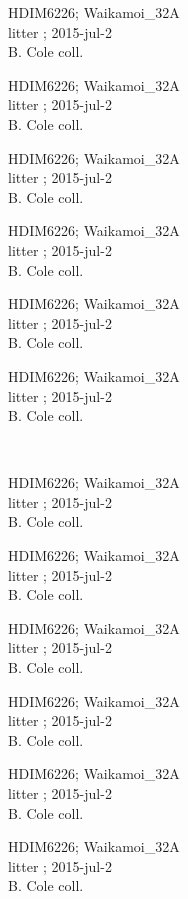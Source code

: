 \documentclass[2pt]{extarticle}
\begin{document}
\noindent
\parbox{0.16\textwidth}{\tiny \raggedright \rule[-0.3\baselineskip]{0pt}{10pt}HDIM6226; Waikamoi\_32A\\ litter  ; 2015-jul-2\\ B. Cole coll.}
\parbox{0.16\textwidth}{\tiny \raggedright \rule[-0.3\baselineskip]{0pt}{10pt}HDIM6226; Waikamoi\_32A\\ litter  ; 2015-jul-2\\ B. Cole coll.}
\parbox{0.16\textwidth}{\tiny \raggedright \rule[-0.3\baselineskip]{0pt}{10pt}HDIM6226; Waikamoi\_32A\\ litter  ; 2015-jul-2\\ B. Cole coll.}
\parbox{0.16\textwidth}{\tiny \raggedright \rule[-0.3\baselineskip]{0pt}{10pt}HDIM6226; Waikamoi\_32A\\ litter  ; 2015-jul-2\\ B. Cole coll.}
\parbox{0.16\textwidth}{\tiny \raggedright \rule[-0.3\baselineskip]{0pt}{10pt}HDIM6226; Waikamoi\_32A\\ litter  ; 2015-jul-2\\ B. Cole coll.}
\parbox{0.16\textwidth}{\tiny \raggedright \rule[-0.3\baselineskip]{0pt}{10pt}HDIM6226; Waikamoi\_32A\\ litter  ; 2015-jul-2\\ B. Cole coll.} \\ 
\vspace{0.001in} 

\noindent
\parbox{0.16\textwidth}{\tiny \raggedright \rule[-0.3\baselineskip]{0pt}{10pt}HDIM6226; Waikamoi\_32A\\ litter  ; 2015-jul-2\\ B. Cole coll.}
\parbox{0.16\textwidth}{\tiny \raggedright \rule[-0.3\baselineskip]{0pt}{10pt}HDIM6226; Waikamoi\_32A\\ litter  ; 2015-jul-2\\ B. Cole coll.}
\parbox{0.16\textwidth}{\tiny \raggedright \rule[-0.3\baselineskip]{0pt}{10pt}HDIM6226; Waikamoi\_32A\\ litter  ; 2015-jul-2\\ B. Cole coll.}
\parbox{0.16\textwidth}{\tiny \raggedright \rule[-0.3\baselineskip]{0pt}{10pt}HDIM6226; Waikamoi\_32A\\ litter  ; 2015-jul-2\\ B. Cole coll.}
\parbox{0.16\textwidth}{\tiny \raggedright \rule[-0.3\baselineskip]{0pt}{10pt}HDIM6226; Waikamoi\_32A\\ litter  ; 2015-jul-2\\ B. Cole coll.}
\parbox{0.16\textwidth}{\tiny \raggedright \rule[-0.3\baselineskip]{0pt}{10pt}HDIM6226; Waikamoi\_32A\\ litter  ; 2015-jul-2\\ B. Cole coll.} \\ 
\vspace{0.001in} 
\end{document}
